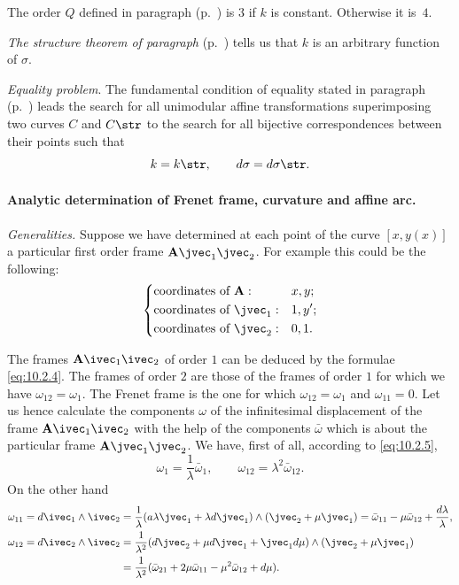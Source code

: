 The order $Q$ defined in paragraph  (p.~\pageref{sec:131}) is $3$ if $k$ is constant. Otherwise it is~$4$.

\emph{The structure theorem of paragraph } (p.~\pageref{sec:77}) tells us that $k$ is an arbitrary function of $\sigma$.

\somespace

\emph{Equality problem}. The fundamental condition of equality stated in paragraph  (p.~\pageref{sec:76}) leads the search for all unimodular affine transformations superimposing two curves $C$ and $C\str$ to the search for all bijective correspondences between their points such that
\[
k=k\str,\qquad d\sigma=d\sigma\str.
\]

\paragraph{Analytic determination of Frenet frame, curvature and affine arc.}
\label{sec:138}
\emph{Generalities.} Suppose we have determined at each point of the curve $[x,y(x)]$ a particular first order frame $\mathbf{A}\jvec_{1}\jvec_{2}$. For example this could be the following:
\begin{equation}
  \label{eq:10.2.9}
  \left\{
    \begin{aligned}
      \text{coordinates of }&\mathbf{A}:&&x,y;\\
      \text{coordinates of }&\jvec_{1}:&&1,y';\\
      \text{coordinates of }&\jvec_{2}:&&0,1.\\      
    \end{aligned}
  \right.
\end{equation}

The frames $\mathbf{A}\ivec_{1}\ivec_{2}$ of order $1$ can be deduced by the formulae \eqref{eq:10.2.4}. The frames of order $2$ are those of the frames of order $1$ for which we have $\omega_{12}=\omega_{1}$. The Frenet frame is the one for which $\omega_{12}=\omega_{1}$ and $\omega_{11}=0$. Let us hence calculate the components $\omega$ of the infinitesimal displacement of the frame $\mathbf{A}\ivec_{1}\ivec_{2}$ with the help of the components $\bar \omega$ which is about the particular frame $\mathbf{A}\jvec_{1}\jvec_{2}$. We have, first of all, according to \eqref{eq:10.2.5},
\[
\omega_{1}=\frac{1}{\lambda}\bar\omega_{1},\qquad\omega_{12}=\lambda^{2}\bar\omega_{12}.
\]
On the other hand
\begin{align*}
  \omega_{11}=d\ivec_{1}\wedge\ivec_{2}&=\frac{1}{\lambda}(a\lambda\jvec_{1}+\lambda d\jvec_{1})\wedge(\jvec_{2}+\mu\jvec_{1})=\bar\omega_{11}-\mu\bar\omega_{12}+\frac{d\lambda}{\lambda},\\
  \omega_{12}=d\ivec_{2}\wedge\ivec_{2}&=\frac{1}{\lambda^{2}}(d\jvec_{2}+\mu d\jvec_{1}+\jvec_{1}d\mu)\wedge(\jvec_{2}+\mu\jvec_{1})\\
  &=\frac{1}{\lambda^{2}}(\bar\omega_{21}+2\mu\bar\omega_{11}-\mu^{2}\bar\omega_{12}+d\mu).
\end{align*}

